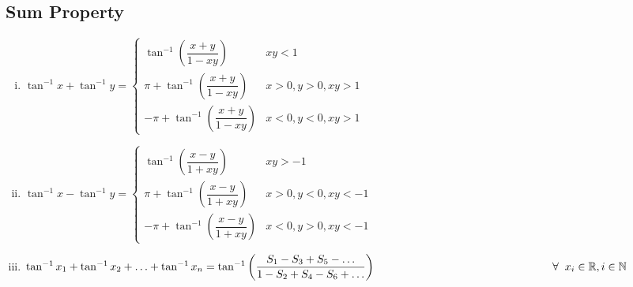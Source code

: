 \documentclass{article}
\begin{document}
\subsection{Sum Property}
\begin{enumerate}[i.]
    \item $\tan^{-1}x+\tan^{-1}y=\begin{cases}
        \tan^{-1}\left(\dfrac{x+y}{1-xy}\right) & xy<1 \\
        \pi + \tan^{-1}\left(\dfrac{x+y}{1-xy}\right) & x>0, y>0, xy>1 \\
        -\pi + \tan^{-1}\left(\dfrac{x+y}{1-xy}\right) & x<0, y<0, xy>1
    \end{cases}$
    \item $\tan^{-1}x-\tan^{-1}y=\begin{cases}
        \tan^{-1}\left(\dfrac{x-y}{1+xy}\right) & xy>-1 \\
        \pi +\tan^{-1}\left(\dfrac{x-y}{1+xy}\right) & x>0, y<0, xy<-1 \\
        -\pi +\tan^{-1}\left(\dfrac{x-y}{1+xy}\right) & x<0, y>0, xy<-1
    \end{cases}$
    \item $\tan^{-1}x_{1}+\tan^{-1}x_{2}+ \ldots + \tan^{-1}x_{n}=\tan^{-1}\left(\dfrac{S_{1}-S_{3}+S_{5}- \ldots}{1-S_{2}+S_{4}-S_{6}+\ldots}\right) \hfill \\ \hphantom{2cm} \hspace{5cm} \forall \hspace{2mm} x_{i} \in \mathbb{R}, i \in \mathbb{N} $
\end{enumerate}
\end{document}
